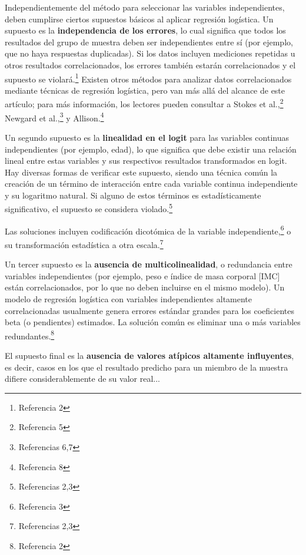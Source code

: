 \documentclass[12pt]{article}
\begin{document}
\begin{itemize}
Independientemente del m\'etodo para seleccionar las variables independientes, deben cumplirse ciertos supuestos b\'asicos al aplicar regresi\'on log\'istica. Un supuesto es la \textbf{independencia de los errores}, lo cual significa que todos los resultados del grupo de muestra deben ser independientes entre s\'i (por ejemplo, que no haya respuestas duplicadas). Si los datos incluyen mediciones repetidas u otros resultados correlacionados, los errores tambi\'en estar\'an correlacionados y el supuesto se violar\'a.\footnote{Referencia 2} Existen otros m\'etodos para analizar datos correlacionados mediante t\'ecnicas de regresi\'on log\'istica, pero van m\'as all\'a del alcance de este art\'iculo; para m\'as informaci\'on, los lectores pueden consultar a Stokes et al.,\footnote{Referencia 5} Newgard et al.,\footnote{Referencias 6,7} y Allison.\footnote{Referencia 8}

Un segundo supuesto es la \textbf{linealidad en el logit} para las variables continuas independientes (por ejemplo, edad), lo que significa que debe existir una relaci\'on lineal entre estas variables y sus respectivos resultados transformados en logit. Hay diversas formas de verificar este supuesto, siendo una t\'ecnica com\'un la creaci\'on de un t\'ermino de interacci\'on entre cada variable continua independiente y su logaritmo natural. Si alguno de estos t\'erminos es estad\'isticamente significativo, el supuesto se considera violado.\footnote{Referencias 2,3}

Las soluciones incluyen codificaci\'on dicot\'omica de la variable independiente,\footnote{Referencia 3} o su transformaci\'on estad\'istica a otra escala.\footnote{Referencias 2,3}

Un tercer supuesto es la \textbf{ausencia de multicolinealidad}, o redundancia entre variables independientes (por ejemplo, peso e \'indice de masa corporal [IMC] est\'an correlacionados, por lo que no deben incluirse en el mismo modelo). Un modelo de regresi\'on log\'istica con variables independientes altamente correlacionadas usualmente genera errores est\'andar grandes para los coeficientes beta (o pendientes) estimados. La soluci\'on com\'un es eliminar una o m\'as variables redundantes.\footnote{Referencia 2}

El supuesto final es la \textbf{ausencia de valores at\'ipicos altamente influyentes}, es decir, casos en los que el resultado predicho para un miembro de la muestra difiere considerablemente de su valor real...

\end{itemize}
\end{document}
